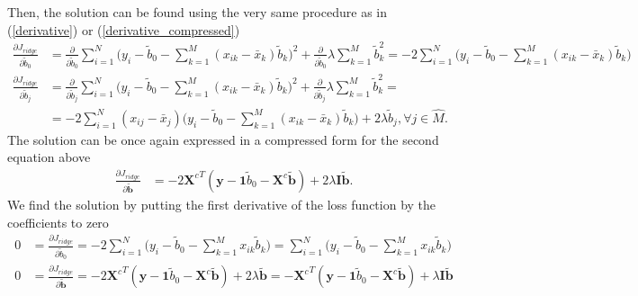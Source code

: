 \documentclass[11pt,oneside,czech,american]{book} %
\theoremstyle{definition} %
\theoremstyle{definition}
\begin{document}
Then, the solution can be found using the very same procedure as in (\ref{derivative}) or (\ref{derivative_compressed})
\begin{equation}
	\begin{aligned}
		\frac{\partial J_{ridge}} {\partial \tilde{b}_0} &= \frac{\partial } {\partial \tilde{b}_0} \sum_{i=1}^{N} \Big(y_i - \tilde{b}_0 - \sum_{k=1}^{M} (x_{ik} - \bar{x}_k) \tilde{b}_k \Big)^2 + \frac{\partial } {\partial \tilde{b}_0} \lambda \sum_{k=1}^{M} \tilde{b}_k^2 = -2 \sum_{i=1}^{N} \Big(y_i - \tilde{b}_0 - \sum_{k=1}^{M} (x_{ik} - \bar{x}_k) \tilde{b}_k \Big) \\
		\frac{\partial J_{ridge}} {\partial \tilde{b}_j} &= \frac{\partial } {\partial \tilde{b}_j} \sum_{i=1}^{N} \Big(y_i - \tilde{b}_0 - \sum_{k=1}^{M} (x_{ik} - \bar{x}_k) \tilde{b}_k \Big)^2 + \frac{\partial } {\partial \tilde{b}_j} \lambda \sum_{k=1}^{M} \tilde{b}_k^2 =\\ 
		&= -2 \sum_{i=1}^{N} (x_{ij} - \bar{x}_j) \Big(y_i - \tilde{b}_0 - \sum_{k=1}^{M} (x_{ik} - \bar{x}_k) \tilde{b}_k \Big) + 2 \lambda \tilde{b}_j , \forall j \in \hat{M}.
	\end{aligned}
	\label{derivative_ridge}
\end{equation}
The solution can be once again expressed in a compressed form for the second equation above
\begin{equation}
	\begin{aligned}
		\frac{\partial J_{ridge}} {\partial \bm{\tilde{b}}} &= -2 {\bm{X}^{c}}^{T} (\bm{y} - \bm{1}\tilde{b}_0 -\bm{X}^c\bm{\tilde{b}}) + 2\lambda \bm{I} \bm{\tilde{b}}.
	\end{aligned}
	\label{derivative_ridge_compressed}
\end{equation}
We find the solution by putting the first derivative of the loss function by the coefficients to zero
\begin{equation}
	\begin{aligned}
		0 &= \frac{\partial J_{ridge}} {\partial \tilde{b}_0} = -2 \sum_{i=1}^{N} \Big(y_i - \tilde{b}_0 - \sum_{k=1}^{M} x_{ik} \tilde{b}_k \Big) = \sum_{i=1}^{N} \Big(y_i - \tilde{b}_0 - \sum_{k=1}^{M} x_{ik} \tilde{b}_k \Big)\\
		0 &= \frac{\partial J_{ridge}} {\partial \bm{\tilde{b}}} = -2{\bm{X}^{c}}^{T} (\bm{y} - \bm{1}\tilde{b}_0 -\bm{X}^c\bm{\tilde{b}}) + 2\lambda \bm{\tilde{b}} = -{\bm{X}^{c}}^{T} (\bm{y} - \bm{1}\tilde{b}_0 - \bm{X}^c\bm{\tilde{b}}) + \lambda \bm{I}\bm{\tilde{b}}
	\end{aligned}
\end{equation}
\end{document}
